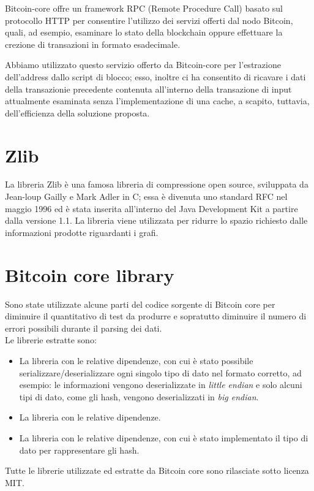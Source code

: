 Bitcoin-core offre un framework RPC (Remote Procedure Call) basato sul protocollo HTTP per consentire l'utilizzo dei servizi offerti dal nodo Bitcoin, quali, ad esempio,  esaminare lo stato della blockchain oppure effettuare la crezione di transazioni in formato esadecimale.

Abbiamo utilizzato questo servizio offerto da Bitcoin-core per l'estrazione dell'address dallo script di blocco; esso, inoltre ci ha consentito di ricavare i dati della transazionie precedente contenuta all'interno della transazione di input attualmente esaminata senza l'implementazione di una cache, a scapito, tuttavia, dell'efficienza della soluzione proposta.

\section{Zlib} \label{sec:zlib}

La libreria Zlib \cite{zlib:github} è una famosa libreria di compressione open source, sviluppata da Jean-loup Gailly e Mark Adler in C; essa è divenuta  uno standard RFC nel maggio 1996 ed è stata inserita all'interno del Java Development Kit a partire dalla versione 1.1.
La libreria viene utilizzata per ridurre lo spazio richiesto dalle informazioni prodotte riguardanti i grafi.

\section{Bitcoin core library} \label{sec:bitcoinCoreLib}

Sono state utilizzate alcune parti del codice sorgente di Bitcoin core per diminuire il quantitativo di test da produrre e sopratutto diminuire il numero di errori possibili durante il parsing dei dati.\\
Le librerie estratte sono:
\begin{itemize}
  \item La libreria  con le relative dipendenze, con cui è stato possibile serializzare/deserializzare ogni singolo tipo di dato nel formato corretto, ad esempio: le informazioni vengono deserializzate in \emph{little endian} e solo alcuni tipi di dato, come gli hash, vengono deserializzati in \emph{big endian}.
  \item La libreria  con le relative dipendenze.
  \item La libreria  con le relative dipendenze, con cui è stato implementato il tipo di dato per rappresentare gli hash.
\end{itemize}
Tutte le librerie utilizzate ed estratte da Bitcoin core sono rilasciate sotto licenza MIT.

